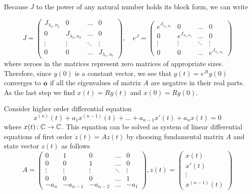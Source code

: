 Because $J$ to the power of any natural number holds its block form, we can write

\begin{equation*}
	J=
	\begin{pmatrix}
		J_{\lambda_1,n_1} & 0 & \ldots & 0 \\
		0 & J_{\lambda_2,n_2} & \ldots & 0 \\
		\vdots & \vdots & \ddots & \vdots \\
		0 & 0 & \ldots & J_{\lambda_r,n_r}
	\end{pmatrix},
	\quad 
	e^J=
	\begin{pmatrix}
		e^{J_{\lambda_1,n_1}} & 0 & \ldots & 0 \\
		0 & e^{J_{\lambda_2,n_2}} & \ldots & 0 \\
		\vdots & \vdots & \ddots & \vdots \\
		0 & 0 & \ldots & e^{J_{\lambda_r,n_r}}
	\end{pmatrix}
\end{equation*}
where zeroes in the matrices represent zero matrices of appropriate sizes. Therefore, since $y(0)$ is a constant vector, we see that $y(t)=e^{Jt}y(0)$ converges to $\textbf{o}$ if all the eigenvalues of matrix $A$ are negative in their real parts. As the last step we find $x(t)=Ry(t)$ and $x(0)=Ry(0)$.

\begin{example}
	Consider higher order differential equation $$x^{(n)}(t)+a_1x^{(n-1)}(t)+\ldots+a_{n-1}x'(t)+a_nx(t)=0$$ where $x(t)\colon\mathbb{C}\rightarrow\mathbb{C}$. This equation can be solved as system of linear differential equations of first order $\dot{z}(t)=Az(t)$ by choosing fundamental matrix $A$ and state vector $z(t)$ as follows
	\begin{equation*}
		A=
		\begin{pmatrix}
			0 & 1 & 0 & \ldots & 0 \\
			0 & 0 & 1 & \ldots & 0 \\
			\vdots & \vdots & \vdots & \ddots & \vdots \\
			0 & 0 & 0 & \ldots & 1 \\
			-a_n & -a_{n-1} & -a_{n-2} & \ldots & -a_1
		\end{pmatrix}
		, z(t)=
		\begin{pmatrix}
			x(t) \\
			x'(t) \\
			\vdots \\
			x^{(n-1)}(t)
		\end{pmatrix}
	\end{equation*}
\end{example}

